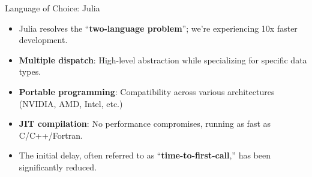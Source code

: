 \begin{frame}{Language of Choice: Julia}
  \begin{itemize}
  \item Julia resolves the ``{\bf two-language problem}''; we're experiencing 10x faster development.
  \item<2-> {\bf Multiple dispatch}: High-level abstraction while specializing for specific data types.
  \item<3-> {\bf Portable programming}: Compatibility across various architectures (NVIDIA, AMD, Intel, etc.)
  \item<4-> {\bf JIT compilation}: No performance compromises, running as fast as C/C++/Fortran.
  \item<5-> The initial delay, often referred to as ``{\bf time-to-first-call},'' has been significantly reduced.
  \end{itemize}
  \begin{center} 
  \end{center}
\end{frame}


